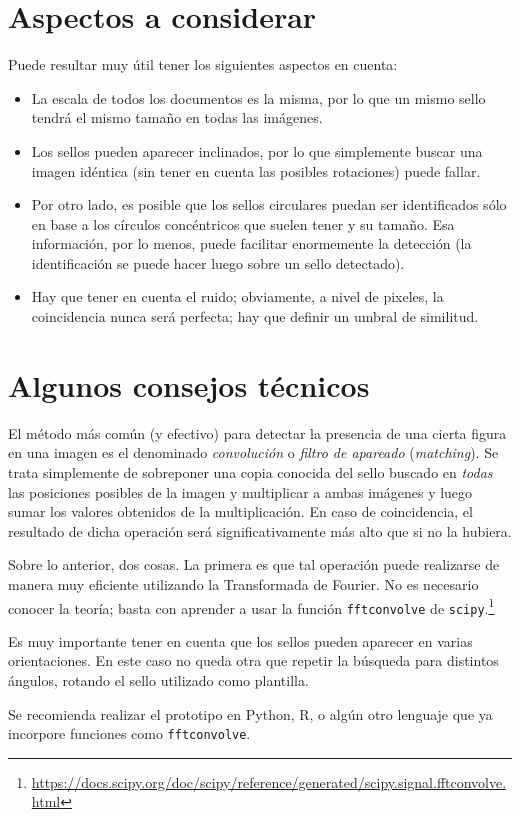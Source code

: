 \documentclass[11pt,a4paper]{article}
\begin{document}
\section{Aspectos a considerar}

Puede resultar muy útil tener los siguientes aspectos en cuenta:
\begin{itemize}
\item La escala de todos los documentos es la misma, por lo que un mismo sello tendrá el mismo tamaño en todas las imágenes.
\item Los sellos pueden aparecer inclinados, por lo que simplemente buscar una imagen idéntica (sin tener en cuenta las posibles rotaciones) puede fallar.
\item Por otro lado, es posible que los sellos circulares puedan ser identificados sólo en base a los círculos concéntricos que suelen tener y su tamaño. Esa información, por lo menos, puede facilitar enormemente la detección (la identificación se puede hacer luego sobre un sello detectado).
\item Hay que tener en cuenta el ruido; obviamente, a nivel de pixeles, la coincidencia nunca será perfecta; hay que definir un umbral de similitud.
\end{itemize}

\section{Algunos consejos técnicos}

El método más común (y efectivo) para detectar la presencia de una cierta figura en una imagen es el denominado \emph{convolución} o \emph{filtro de apareado} (\emph{matching}). Se trata simplemente de sobreponer una copia conocida del sello buscado en \emph{todas} las posiciones posibles de la imagen y multiplicar a ambas imágenes y luego sumar los valores obtenidos de la multiplicación. En caso de coincidencia, el resultado de dicha operación será significativamente más alto que si no la hubiera.

Sobre lo anterior, dos cosas. La primera es que tal operación puede realizarse de manera muy eficiente utilizando la Transformada de Fourier. No es necesario conocer la teoría; basta con aprender a usar la función \texttt{fftconvolve} de \texttt{scipy}.\footnote{\url{https://docs.scipy.org/doc/scipy/reference/generated/scipy.signal.fftconvolve.html}}

Es muy importante tener en cuenta que los sellos pueden aparecer en varias orientaciones. En este caso no queda otra que repetir la búsqueda para distintos ángulos, rotando el sello utilizado como plantilla.

Se recomienda realizar el prototipo en Python, R, o algún otro lenguaje que ya incorpore funciones como \texttt{fftconvolve}.
\end{document}
